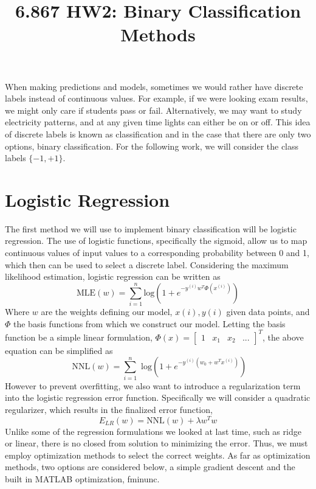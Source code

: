 \documentclass[10pt,twocolumn]{article}
\begin{document}
\title{6.867 HW2: Binary Classification Methods}
\maketitle
When making predictions and models, sometimes we would rather have discrete labels instead of continuous values. For example, if we were looking exam results, we might only care if students pass or fail. Alternatively, we may want to study electricity patterns, and at any given time lights can either be on or off. This idea of discrete labels is known as classification and in the case that there are only two options, binary classification. For the following work, we will consider the class labels $\{-1, +1\}$. 

\section{Logistic Regression}
 
 The first method we will use to implement binary classification will be logistic regression. The use of logistic functions, specifically the sigmoid, allow us to map continuous values of input values to a corresponding probability between 0 and 1, which then can be used to select a discrete label. Considering the maximum likelihood estimation, logistic regression can be written as 
 \begin{equation}
 \textrm{MLE}(w)= \sum_{i=1}^{n} \textrm{log}(1+e^{-y^{(i)}w^T \Phi(x^{(i)})})
 \end{equation}
 Where $w$ are the weights defining our model, $x(i), y(i)$ given data points, and $\Phi$ the basis functions from which we construct our model. Letting the basis function be a simple linear formulation, $\Phi(x)= \begin{bmatrix} 1 & x _1 & x_2 & ... \end{bmatrix}^T$, the above equation can be simplified as 
 \begin{equation}
\textrm{ NNL}(w)= \sum_{i=1}^{n}\textrm{ log}(1+e^{-y^{(i)}(w_0+w^Tx^{(i)})})
 \end{equation}
 However to prevent overfitting, we also want to introduce a regularization term into the logistic regression error function. Specifically we will consider a quadratic regularizer, which results in the finalized error function, 
 \begin{equation}
 E_{LR}(w)= \textrm{NNL}(w) +\lambda w^Tw
 \end{equation}
 Unlike some of the regression formulations we looked at last time, such as ridge or linear, there is no closed from solution to minimizing the error. Thus, we must employ optimization methods to select the correct weights. As far as optimization methods, two options are considered below, a simple gradient descent and the built in MATLAB optimization, fminunc. 
 
\end{document}
